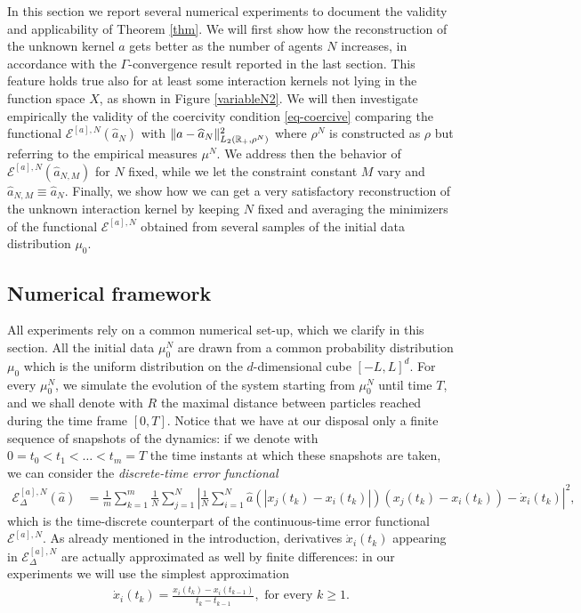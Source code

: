 In this section we report several numerical experiments to document the validity and applicability of Theorem \ref{thm}. We will first show how the reconstruction of the unknown kernel $a$ gets better as the number of agents $N$ increases, in accordance with the $\Gamma$-convergence result reported in the last section. This feature holds true also for at least some interaction kernels not lying in the function space $X$, as shown in Figure \ref{variableN2}. We will then investigate empirically the validity of the coercivity condition \eqref{eq-coercive} comparing the functional $\mathcal E^{[a],N}(\widehat a_N)$ with $\|a - \widehat a_N\|_{L_2(\mathbb{R}_+,\rho^N)}^2$ where $\rho^N$ is constructed as $\rho$ but referring to the empirical measures $\mu^N$. We address then the behavior of $\mathcal E^{[a],N}(\widehat a_{N,M})$ for $N$ fixed, while we let the constraint constant  $M$ vary and $\widehat a_{N,M}\equiv\widehat a_{N}$. Finally, we show how we can get a very satisfactory reconstruction of the unknown interaction kernel by keeping $N$ fixed and averaging the minimizers of the functional $\mathcal E^{[a],N}$ obtained from several samples of the initial data distribution $\mu_0$.

\subsection{Numerical framework}\label{numfram}

All experiments  rely on a common numerical set-up, which we clarify in this section. All the initial data $\mu^N_0$ are drawn from a common probability distribution $\mu_0$ which is the uniform distribution on the $d$-dimensional cube $[-L,L]^d$. For every $\mu^N_0$, we simulate the evolution of the system starting from $\mu^N_0$ until time $T$, and we shall denote with $R$ the maximal distance between particles reached during the time frame $[0,T]$. Notice that we have at our disposal only a finite sequence of snapshots of the dynamics: if we denote with $0 = t_0 < t_1 < \ldots < t_m = T$ the time instants at which these snapshots are taken, we can consider the \textit{discrete-time error functional}
\begin{align*}
\mathcal{E}^{[a],N}_\Delta(\widehat{a}) & = \frac{1}{m} \sum^m_{k = 1} \frac{1}{N} \sum^N_{j = 1} \left| \frac{1}{N} \sum^N_{i = 1} \widehat{a}(|x_j(t_k) - x_i(t_k)|)(x_j(t_k) - x_i(t_k)) - \dot{x}_i(t_k)\right|^2,
\end{align*}
which is the time-discrete counterpart of the continuous-time error functional $\mathcal{E}^{[a],N}$. As already mentioned in the introduction, derivatives $\dot{x}_i(t_k)$ appearing in $\mathcal{E}^{[a],N}_\Delta$ are actually approximated as well by finite differences: in our experiments we will use the simplest approximation
\begin{align*}
\dot{x}_i(t_k) = \frac{x_i(t_k) - x_i(t_{k-1})}{t_k - t_{k-1}}, \text{ for every } k \geq 1.
\end{align*}

